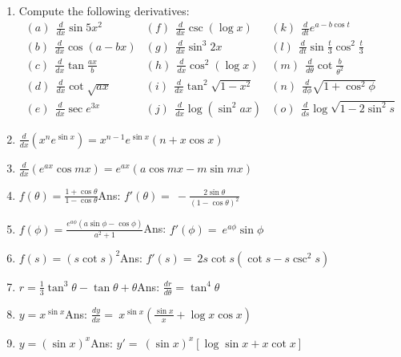 \begin{enumerate}
\item
Compute the following derivatives: %
\[
\begin{array}{lll}
(a) \ \  \frac{d}{dx} \sin 5x^2 &  	(f) \ \  \frac{d}{dx} \csc(\log x) &  	(k) \ \  \frac{d}{dt} e^{a - b\cos t}\\
(b) \ \  \frac{d}{dx} \cos(a - bx) &  	(g) \ \  \frac{d}{dx} \sin^3 2x & (l) \ \  \frac{d}{dt} \sin \frac{t}{3} \cos^2 \frac{t}{3}\\
(c) \ \  \frac{d}{dx} \tan \frac{ax}{b} &  	(h) \ \  \frac{d}{dx} \cos^2(\log x) &  	(m) \ \  \frac{d}{d\theta} \cot \frac{b}{\theta^2}\\
(d) \ \  \frac{d}{dx} \cot \sqrt{ax} &  	(i) \ \  \frac{d}{dx} \tan^2 \sqrt{1 - x^2} &  	(n) \ \  \frac{d}{d\phi} \sqrt{1 + \cos^2 \phi}\\
(e) \ \  \frac{d}{dx} \sec e^{3x} &  	(j) \ \  \frac{d}{dx} \log(\sin^2 ax) &  	(o) \ \  \frac{d}{ds} \log \sqrt{1 - 2\sin^2 s}
\end{array}
\]

\item
$\frac{d}{dx}(x^n e^{\sin x}) = x^{n - 1} e^{\sin x} (n + x\cos x)$

\item
$\frac{d}{dx} (e^{ax} \cos mx) = e^{ax}(a \cos mx - m \sin mx)$

\item
$f(\theta) = \frac{1 + \cos \theta}{1 - \cos \theta}$\qquad\qquad\qquad\qquad\qquad\qquad Ans:  	
$ f'(\theta) 	=\ -\frac{2 \sin \theta}{(1 - \cos \theta)^2}$

\item
$f(\phi) = \frac{e^{a\phi}(a \sin \phi - \cos \phi)}{a^2 + 1}$\qquad\qquad\qquad\qquad\qquad\qquad Ans:  	
$ f'(\phi) 	=\ e^{a\phi} \sin \phi$

\item
$f(s) = (s \cot s)^2$\qquad\qquad\qquad\qquad Ans:  	 
$f'(s) =\ 2s \cot s (\cot s - s \csc^2 s)$

\item
$r = \frac{1}{3} \tan^3 \theta - \tan \theta + \theta$\qquad\qquad\qquad\qquad\qquad\qquad Ans:  
$\frac{dr}{d\theta} 	= \tan^4\theta$

\item
$y = x^{\sin x}$\qquad\qquad\qquad\qquad\qquad\qquad Ans:  
$\frac{dy}{dx} 	=\ x^{\sin x} \left ( \frac{\sin x}{x} + \log x \cos x \right )$

\item
$y = (\sin x)^x$\qquad\qquad\qquad\qquad\qquad\qquad Ans:  	
$y' 	=\ (\sin x)^x [ \log \sin x + x \cot x]$


\end{enumerate}
